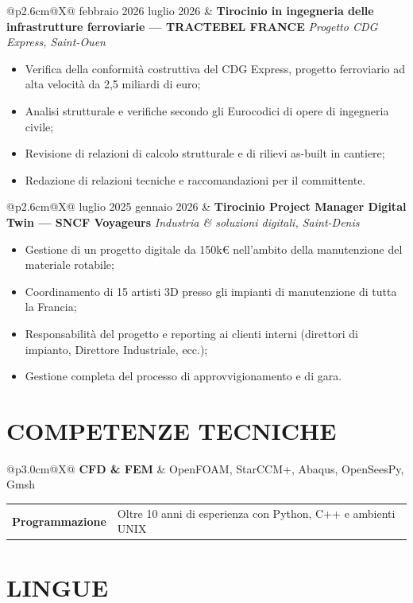 \documentclass[a4paper,9pt]{extarticle}
\makeatletter
\newcommand{\entry}[4]{%
  \noindent
  \begin{tabularx}{\linewidth}{@{}p{2.6cm}@{\hspace{6pt}}X@{}}
    \small\textcolor{muted}{#1} &
    \textbf{#2} \newline
    \textit{\small\textcolor{muted}{#3}}
    #4
  \end{tabularx}
  \vspace{1pt}
}
\newcommand{\skillrow}[2]{%
  \noindent
  \begin{tabularx}{\linewidth}{@{}p{3.0cm}@{\hspace{4pt}}X@{}}
    \small\textbf{\textcolor{accent}{#1}} & \small #2
  \end{tabularx}\par\vspace{1pt}
}
\makeatother
\begin{document}
\entry{febbraio 2026 \newline luglio 2026}
  {Tirocinio in ingegneria delle infrastrutture ferroviarie — TRACTEBEL FRANCE}
  {Progetto CDG Express, Saint-Ouen}
  {\begin{itemize}
    \item Verifica della conformità costruttiva del CDG Express, progetto ferroviario ad alta velocità da 2,5 miliardi di euro;
    \item Analisi strutturale e verifiche secondo gli Eurocodici di opere di ingegneria civile;
    \item Revisione di relazioni di calcolo strutturale e di rilievi as-built in cantiere;
    \item Redazione di relazioni tecniche e raccomandazioni per il committente.
  \end{itemize}}

\entry{luglio 2025 \newline gennaio 2026}
  {Tirocinio Project Manager Digital Twin — SNCF Voyageurs}
  {Industria \& soluzioni digitali, Saint-Denis}
  {\begin{itemize}
    \item Gestione di un progetto digitale da 150k€ nell'ambito della manutenzione del materiale rotabile;
    \item Coordinamento di 15 artisti 3D presso gli impianti di manutenzione di tutta la Francia;
    \item Responsabilità del progetto e reporting ai clienti interni (direttori di impianto, Direttore Industriale, ecc.);
    \item Gestione completa del processo di approvvigionamento e di gara.
  \end{itemize}}



\section{COMPETENZE TECNICHE}

\skillrow{CFD \& FEM}{OpenFOAM, StarCCM+, Abaqus, OpenSeesPy, Gmsh}
\skillrow{Programmazione}{Oltre 10 anni di esperienza con Python, C++ e ambienti UNIX}

\section{LINGUE}
\end{document}
